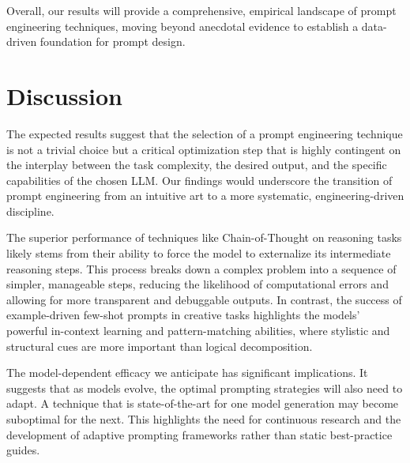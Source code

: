 \documentclass{article}
\begin{document}
Overall, our results will provide a comprehensive, empirical landscape of prompt engineering techniques, moving beyond anecdotal evidence to establish a data-driven foundation for prompt design.

\section{Discussion}

The expected results suggest that the selection of a prompt engineering technique is not a trivial choice but a critical optimization step that is highly contingent on the interplay between the task complexity, the desired output, and the specific capabilities of the chosen LLM. Our findings would underscore the transition of prompt engineering from an intuitive art to a more systematic, engineering-driven discipline.

The superior performance of techniques like Chain-of-Thought on reasoning tasks likely stems from their ability to force the model to externalize its intermediate reasoning steps. This process breaks down a complex problem into a sequence of simpler, manageable steps, reducing the likelihood of computational errors and allowing for more transparent and debuggable outputs. In contrast, the success of example-driven few-shot prompts in creative tasks highlights the models' powerful in-context learning and pattern-matching abilities, where stylistic and structural cues are more important than logical decomposition.

The model-dependent efficacy we anticipate has significant implications. It suggests that as models evolve, the optimal prompting strategies will also need to adapt. A technique that is state-of-the-art for one model generation may become suboptimal for the next. This highlights the need for continuous research and the development of adaptive prompting frameworks rather than static best-practice guides.
\end{document}

